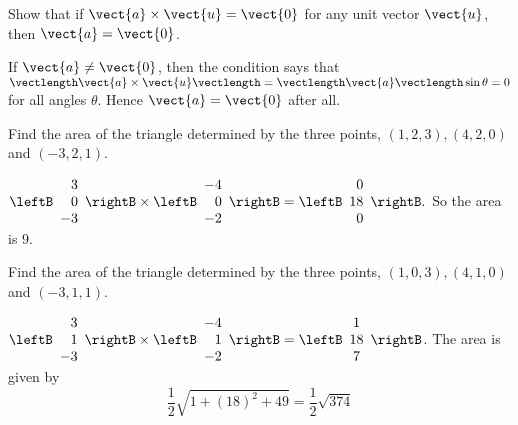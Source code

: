 \begin{enumialphparenastyle}

\begin{ex} Show that if $\vect{a}\times \vect{u}=\vect{0}$ for any unit vector $\vect{u}
$, then $\vect{a}=\vect{0}$.
\begin{sol}
If $\vect{a}\neq \vect{0}$, then the condition says that $\vectlength \vect{a}\times \vect{u}\vectlength = \vectlength \vect{a} \vectlength \sin \theta =0$ for all angles $\theta $. Hence $\vect{a} = \vect{0}$ after all.
\end{sol}
\end{ex}

\begin{ex} Find the area of the triangle determined by the three points, $\left(
1,2,3\right) ,\left( 4,2,0\right) $ and $\left( -3,2,1\right) .$
\begin{sol}
$\leftB \begin{array}{r}
3 \\
0 \\
-3
\end{array}
\rightB \times \leftB \begin{array}{r}
 -4 \\
0 \\
-2
\end{array}
\rightB =\leftB
\begin{array}{r}
0 \\
18 \\
0
\end{array}
\rightB .$ So the area is $9.$
\end{sol}
\end{ex}

\begin{ex} Find the area of the triangle determined by the three points, $\left(
1,0,3\right) ,\left( 4,1,0\right) $ and $\left( -3,1,1\right) .$
\begin{sol}
 $\leftB \begin{array}{r}
3 \\
1 \\
-3
\end{array}
\rightB \times \leftB
\begin{array}{r}
 -4 \\
1 \\
-2
\end{array}
\rightB =\leftB
\begin{array}{c}
1 \\
18 \\
7
\end{array}
\rightB$. The area is given by 
\[
\frac{1}{2}\sqrt{1+\left( 18\right) ^{2}+49}=\frac{1}{2}\sqrt{374}
\]
\end{sol}
\end{ex}


\end{enumialphparenastyle}
